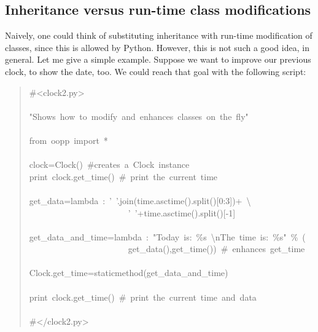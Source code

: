 \documentclass[10pt,english]{article}
\begin{document}
\hypertarget{inheritance-versus-run-time-class-modifications}{}
\subsection*{Inheritance versus run-time class modifications}

Naively, one could think of substituting inheritance with run-time 
modification of classes, since this is allowed by Python. However,
this is not such a good idea, in general. Let me give a simple example.
Suppose we want to improve our previous clock, to show the date, too.
We could reach that goal with the following script:
\begin{quote}
\begin{ttfamily}\begin{flushleft}
\mbox{{\#}<clock2.py>}\\
\mbox{}\\
\mbox{"Shows~how~to~modify~and~enhances~classes~on~the~fly"}\\
\mbox{}\\
\mbox{from~oopp~import~*}\\
\mbox{}\\
\mbox{clock=Clock()~{\#}creates~a~Clock~instance}\\
\mbox{print~clock.get{\_}time()~{\#}~print~the~current~time}\\
\mbox{}\\
\mbox{get{\_}data=lambda~:~'~'.join(time.asctime().split()[0:3])+~{\textbackslash}}\\
\mbox{~~~~~~~~~~~~~~~~~~~~~~~'~'+time.asctime().split()[-1]}\\
\mbox{}\\
\mbox{get{\_}data{\_}and{\_}time=lambda~:~"Today~is:~{\%}s~{\textbackslash}nThe~time~is:~{\%}s"~{\%}~(}\\
\mbox{~~~~~~~~~~~~~~~~~~~~~~~get{\_}data(),get{\_}time())~{\#}~enhances~get{\_}time}\\
\mbox{}\\
\mbox{Clock.get{\_}time=staticmethod(get{\_}data{\_}and{\_}time)}\\
\mbox{}\\
\mbox{print~clock.get{\_}time()~{\#}~print~the~current~time~and~data}\\
\mbox{}\\
\mbox{{\#}</clock2.py>}
\end{flushleft}\end{ttfamily}
\end{quote}
\end{document}
